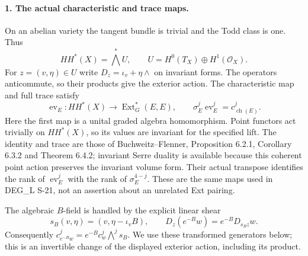 \paragraph{1. The actual characteristic and trace maps.}
On an abelian variety the tangent bundle is trivial and the Todd
class is one. Thus
\[
 HH^*(X)=\bigwedge^*U,\qquad
 U=H^0(T_X)\oplus H^1(\mathcal O_X).
\]
For $z=(v,\eta)\in U$ write $D_z=\iota_v+\eta\wedge$ on invariant
forms. The operators anticommute, so their products give the exterior
action. The characteristic map and full trace satisfy
\[
 \operatorname{ev}_E:HH^*(X)\longrightarrow
                   \operatorname{Ext}^*_G(E,E),\qquad
 \sigma_E^j\operatorname{ev}_E^j=c_{\operatorname{ch}(E)}^j.
 \tag{F1R7.4}
\]
Here the first map is a unital graded algebra homomorphism. Point
functors act trivially on $HH^*(X)$, so its values are invariant for
the specified lift. The identity and trace are those of
Buchweitz--Flenner, Proposition 6.2.1, Corollary 6.3.2 and Theorem
6.4.2; invariant Serre duality is available because this coherent
point action preserves the invariant volume form. Their actual
transpose identifies the rank of $\operatorname{ev}_E^j$ with the
rank of $\sigma_E^{4-j}$. These are the same maps used in DEG\_L S-21,
not an assertion about an unrelated Ext pairing.

The algebraic $B$-field is handled by the explicit linear shear
\[
 s_B(v,\eta)=(v,\eta-\iota_vB),\qquad
 D_z(e^{-B}w)=e^{-B}D_{s_Bz}w.
 \tag{F1R7.5}
\]
Consequently
$c_{e^{-B}w}^j=e^{-B}c_w^j\bigwedge^j s_B$.
We use these transformed generators below; this is an invertible
change of the displayed exterior action, including its product.

